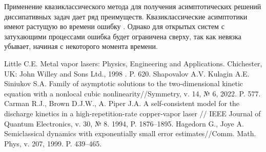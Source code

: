 Применение квазиклассического метода для получения асимптотических решений диссипативных задач дает ряд преимуществ. Квазиклассические асимптотики имеют растущую во времени ошибку \cite{HagJo}. Однако для открытых систем с затухающими процессами ошибка будет ограничена сверху, так как невязка убывает, начиная с некоторого момента времени.

%



\begin{thebibliography}{9} %
 Little C.E. Metal vapor lasers: Physics, Engineering and Applications.  Chichester, UK: John Willey and Sons Ltd., 1998 . P. 620.
 Shapovalov A.V. Kulagin A.E. Siniukov S.A. Family of asymptotic solutions to the two-dimensional kinetic equation with a nonlocal cubic nonlinearity//Symmetry, v. 14, № 6, 2022. P. 577.
 Carman R.J., Brown D.J.W., A. Piper J.A. A self-consistent model for the discharge kinetics in a high-repetition-rate copper-vapor laser // IEEE Journal of Quantum Electronics, v. 30, № 8. 1994, P. 1876--1895.
 Hagedorn G., Joye A. Semiclassical dynamics with exponentially small error estimates//Comm. Math.  Phys, v. 207, 1999. P. 439--465.
\end{thebibliography}





%





